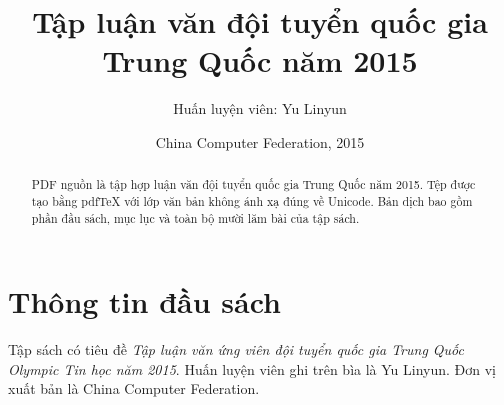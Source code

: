 \documentclass[11pt]{article}
\title{Tập luận văn đội tuyển quốc gia Trung Quốc năm 2015}
\author{Huấn luyện viên: Yu Linyun}
\date{China Computer Federation, 2015}
\begin{document}
\maketitle


\renewcommand{\abstractname}{Tóm tắt}
\begin{abstract}
PDF nguồn là tập hợp luận văn đội tuyển quốc gia Trung Quốc năm 2015. Tệp được
tạo bằng pdfTeX với lớp văn bản không ánh xạ đúng về Unicode. Bản dịch bao gồm
phần đầu sách, mục lục và toàn bộ mười lăm bài của tập sách.
\end{abstract}

\section{Thông tin đầu sách}

Tập sách có tiêu đề \emph{Tập luận văn ứng viên đội tuyển quốc gia Trung Quốc
Olympic Tin học năm 2015}. Huấn luyện viên ghi trên bìa là Yu Linyun. Đơn vị
xuất bản là China Computer Federation.
\end{document}
